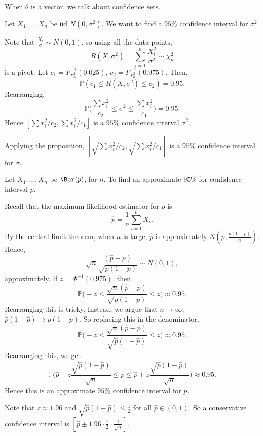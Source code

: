\documentclass[12pt]{article}
\begin{document}
\begin{remark}
	When $\theta$ is a vector, we talk about confidence sets.
\end{remark}

\begin{exbox}
	Let $X_1, \ldots, X_n$ be iid $N(0, \sigma^2)$. We want to find a $95$\% confidence interval for $\sigma^2$.

	Note that $\frac{X_i}{\sigma} \sim N(0,1)$, so using all the data points,
	\[
	R(X, \sigma^2) = \sum_{i=1}^{n} \frac{X_i^2}{\sigma^2} \sim \chi^2_n
	\]
	is a pivot. Let $c_1 = F_{\chi^2_n}^{-1}(0.025)$, $c_2 = F_{\chi^2_n}^{-1}(0.975)$. Then,
	\[
	\mathbb{P}(c_1 \leq R(X, \sigma^2) \leq c_2) = 0.95
	.\]
	Rearranging,
	\[
	\mathbb{P}\biggl( \frac{\sum x_i^2}{c_2} \leq \sigma^2 \leq \frac{\sum x_i^2}{c_1} \biggr) = 0.95
	.\]
	Hence $[\sum x_i^2/c_2, \sum x_i^2/c_1]$ is a $95$\% confidence interval $\sigma^2$.

	Applying the proposition, $[\sqrt{\sum x_i^2/c_2}, \sqrt{\sum x_i^2/c_1}]$ is a $95$\% confidence interval for $\sigma$.
\end{exbox}

\begin{exbox}
	Let $X_1, \ldots, X_n$ be $\Ber(p)$, for $n$. To find an approximate $95$\% for confidence interval $p$.

	Recall that the maximum likelihood estimator for $p$ is
	\[
	\hat p = \frac{1}{n} \sum_{i = 1}^{n} X_i
	.\]
	By the central limit theorem, when $n$ is large, $\hat p$ is approximately $N(p, \frac{p(1-p)}{n})$. Hence,
	\[
		\sqrt n \frac{(\hat p - p)}{\sqrt{p(1-p)}} \sim N(0,1)
	,\]
	approximately. If $z = \Phi^{-1}(0.975)$, then
	\[
		\mathbb{P}\biggl( - z \leq \frac{\sqrt n (\hat p - p)}{\sqrt{p(1-p)}} \leq z \biggr) \approx 0.95
	.\]
	Rearranging this is tricky. Instead, we argue that $n \to \infty$, $\hat p(1 - \hat p) \to p(1-p)$. So replacing this in the denominator,
	\[
		\mathbb{P}\biggl( - z \leq \frac{\sqrt n (\hat p - p)}{\sqrt{\hat p(1- \hat p)}} \leq z \biggr) \approx 0.95
	.\]
	Rearranging this, we get
	\[
		\mathbb{P}\biggl( \hat p - z \frac{\sqrt{\hat p (1 - \hat p)}}{\sqrt n} \leq p \leq \hat p + z \frac{\sqrt{\hat p (1 - \hat p)}}{\sqrt n} \biggr) \approx 0.95
	.\]
	Hence this is an approximate $95$\% confidence interval for $p$.

	Note that $z \approx 1.96$ and $\sqrt{\hat p(1 - \hat p)} \leq \frac{1}{2}$ for all $\hat p \in (0, 1)$. So a conservative confidence interval is $[\hat p \pm 1.96 \cdot \frac{1}{2} \cdot \frac{1}{\sqrt{n}}]$.
\end{exbox}
\end{document}
